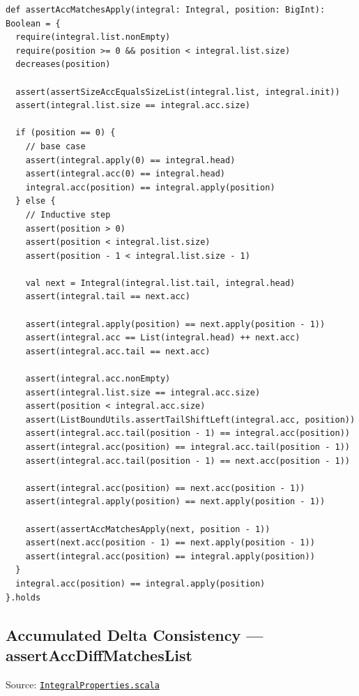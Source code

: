 \begin{lstlisting}[style=scala]
def assertAccMatchesApply(integral: Integral, position: BigInt): Boolean = {
  require(integral.list.nonEmpty)
  require(position >= 0 && position < integral.list.size)
  decreases(position)

  assert(assertSizeAccEqualsSizeList(integral.list, integral.init))
  assert(integral.list.size == integral.acc.size)

  if (position == 0) {
    // base case
    assert(integral.apply(0) == integral.head)
    assert(integral.acc(0) == integral.head)
    integral.acc(position) == integral.apply(position)
  } else {
    // Inductive step
    assert(position > 0)
    assert(position < integral.list.size)
    assert(position - 1 < integral.list.size - 1)

    val next = Integral(integral.list.tail, integral.head)
    assert(integral.tail == next.acc)

    assert(integral.apply(position) == next.apply(position - 1))
    assert(integral.acc == List(integral.head) ++ next.acc)
    assert(integral.acc.tail == next.acc)

    assert(integral.acc.nonEmpty)
    assert(integral.list.size == integral.acc.size)
    assert(position < integral.acc.size)
    assert(ListBoundUtils.assertTailShiftLeft(integral.acc, position))
    assert(integral.acc.tail(position - 1) == integral.acc(position))
    assert(integral.acc(position) == integral.acc.tail(position - 1))
    assert(integral.acc.tail(position - 1) == next.acc(position - 1))

    assert(integral.acc(position) == next.acc(position - 1))
    assert(integral.apply(position) == next.apply(position - 1))

    assert(assertAccMatchesApply(next, position - 1))
    assert(next.acc(position - 1) == next.apply(position - 1))
    assert(integral.acc(position) == integral.apply(position))
  }
  integral.acc(position) == integral.apply(position)
}.holds
\end{lstlisting}

\subsection{Accumulated Delta Consistency --- assertAccDiffMatchesList}

Source:
\href{https://github.com/thiagomata/prime-numbers/blob/master/src/main/scala/v1/chapter3/list/integral/properties/IntegralProperties.scala}{\texttt{IntegralProperties.scala}}

